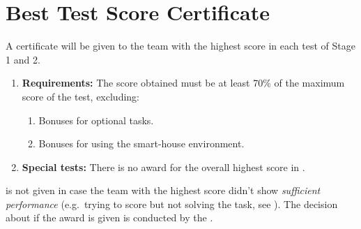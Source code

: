 \section{Best Test Score Certificate}\label{sec:best_score_certificate}
A certificate will be given to the team with the highest score in each test of Stage 1 and 2. 

\begin{enumerate}
	\item \textbf{Requirements:} The score obtained must be at least 70\% of the maximum score of the test, excluding:
	\begin{enumerate}
		\item Bonuses for optional tasks.
		\item Bonuses for using the smart-house environment.
	\end{enumerate}
	\item \textbf{Special tests:} There is no award for the overall highest score in .
\end{enumerate}

 is not given in case the team with the highest score didn't show \emph{sufficient performance} (e.g.~trying to score but not solving the task, see ). The decision about if the award is given is conducted by the .


